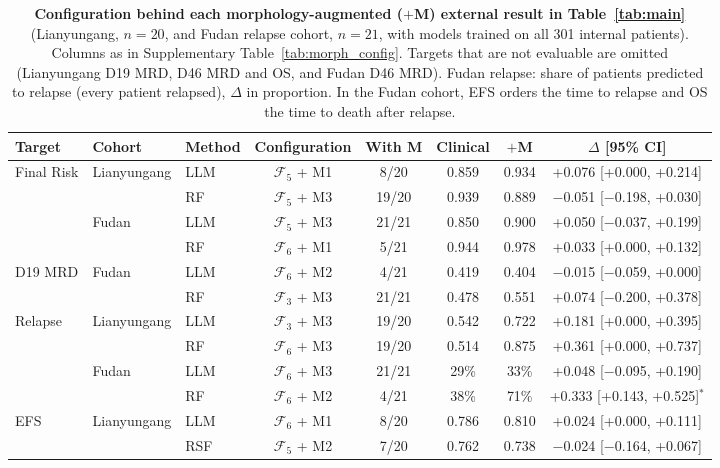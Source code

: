 \documentclass[pdflatex,sn-nature]{sn-jnl}
\begin{document}
\begin{appendices}
\begin{table}[ht]
\caption{\textbf{Configuration behind each morphology-augmented
($+$M) external result in Table~\ref{tab:main}} (Lianyungang, $n=20$, and
Fudan relapse cohort, $n=21$, with models trained on all 301 internal
patients). Columns as in Supplementary Table~\ref{tab:morph_config}.
Targets that are not evaluable are omitted (Lianyungang D19 MRD, D46
MRD and OS, and Fudan D46 MRD). Fudan relapse: share of patients predicted
to relapse (every patient relapsed), $\Delta$ in proportion. In the
Fudan cohort, EFS orders the time to relapse and OS the time to death
after relapse.}
\label{tab:morph_config_ext}
\centering
\footnotesize
\setlength{\tabcolsep}{2.2pt}
\begin{tabular}{@{}lllccccc@{}}
\toprule
\textbf{Target} & \textbf{Cohort} & \textbf{Method} & \textbf{Configuration} & \textbf{With M} & \textbf{Clinical} & \textbf{$+$M} & \textbf{$\Delta$ [95\% CI]} \\
\midrule
Final Risk & Lianyungang & LLM & $\mathcal{F}_5$ + M1 & 8/20 & 0.859 & 0.934 & +0.076 [+0.000, +0.214] \\
 &  & RF & $\mathcal{F}_5$ + M3 & 19/20 & 0.939 & 0.889 & $-$0.051 [$-$0.198, +0.030] \\
 & Fudan & LLM & $\mathcal{F}_5$ + M3 & 21/21 & 0.850 & 0.900 & +0.050 [$-$0.037, +0.199] \\
 &  & RF & $\mathcal{F}_6$ + M1 & 5/21 & 0.944 & 0.978 & +0.033 [+0.000, +0.132] \\
\addlinespace[2pt]
D19 MRD & Fudan & LLM & $\mathcal{F}_6$ + M2 & 4/21 & 0.419 & 0.404 & $-$0.015 [$-$0.059, +0.000] \\
 &  & RF & $\mathcal{F}_3$ + M3 & 21/21 & 0.478 & 0.551 & +0.074 [$-$0.200, +0.378] \\
\addlinespace[2pt]
Relapse & Lianyungang & LLM & $\mathcal{F}_3$ + M3 & 19/20 & 0.542 & 0.722 & +0.181 [+0.000, +0.395] \\
 &  & RF & $\mathcal{F}_6$ + M3 & 19/20 & 0.514 & 0.875 & +0.361 [+0.000, +0.737] \\
 & Fudan & LLM & $\mathcal{F}_6$ + M3 & 21/21 & 29\% & 33\% & +0.048 [$-$0.095, +0.190] \\
 &  & RF & $\mathcal{F}_6$ + M2 & 4/21 & 38\% & 71\% & +0.333 [+0.143, +0.525]$^{*}$ \\
\addlinespace[2pt]
EFS & Lianyungang & LLM & $\mathcal{F}_6$ + M1 & 8/20 & 0.786 & 0.810 & +0.024 [+0.000, +0.111] \\
 &  & RSF & $\mathcal{F}_5$ + M2 & 7/20 & 0.762 & 0.738 & $-$0.024 [$-$0.164, +0.067] \\

\end{tabular}
\end{table}
\end{appendices}
\end{document}
